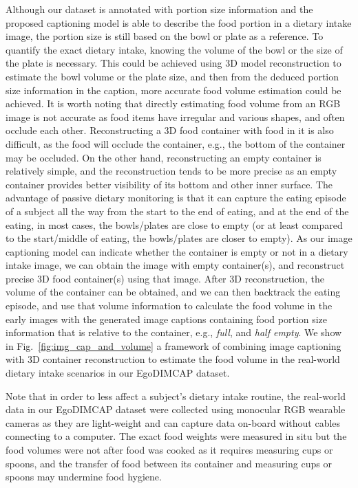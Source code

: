 \documentclass[journal]{IEEEtran}
\begin{document}
Although our dataset is annotated with portion size information and the proposed captioning model is able to describe the food portion in a dietary intake image, the portion size is still based on the bowl or plate as a reference. To quantify the exact dietary intake, knowing the volume of the bowl or the size of the plate is necessary. This could be achieved using 3D model reconstruction to estimate the bowl volume or the plate size, and then from the deduced portion size information in the caption, more accurate food volume estimation could be achieved. It is worth noting that directly estimating food volume from an RGB image is not accurate as food items have irregular and various shapes, and often occlude each other. Reconstructing a 3D food container with food in it is also difficult, as the food will occlude the container, e.g., the bottom of the container may be occluded. On the other hand, reconstructing an empty container is relatively simple, and the reconstruction tends to be more precise as an empty container provides better visibility of its bottom and other inner surface. The advantage of passive dietary monitoring is that it can capture the eating episode of a subject all the way from the start to the end of eating, and at the end of the eating, in most cases, the bowls/plates are close to empty (or at least compared to the start/middle of eating, the bowls/plates are closer to empty). As our image captioning model can indicate whether the container is empty or not in a dietary intake image, we can obtain the image with empty container(s), and reconstruct precise 3D food container(s) using that image. After 3D reconstruction, the volume of the container can be obtained, and we can then backtrack the eating episode, and use that volume information to calculate the food volume in the early images with the generated image captions containing food portion size information that is relative to the container, e.g., \textit{full}, and \textit{half empty}. We show in Fig.~\ref{fig:img_cap_and_volume} a framework of combining image captioning with 3D container reconstruction to estimate the food volume in the real-world dietary intake scenarios in our EgoDIMCAP dataset.

Note that in order to less affect a subject's dietary intake routine, the real-world data in our EgoDIMCAP dataset were collected using monocular RGB wearable cameras as they are light-weight and can capture data on-board without cables connecting to a computer. The exact food weights were measured in situ but the food volumes were not after food was cooked as it requires measuring cups or spoons, and the transfer of food between its container and measuring cups or spoons may undermine food hygiene.
\end{document}
